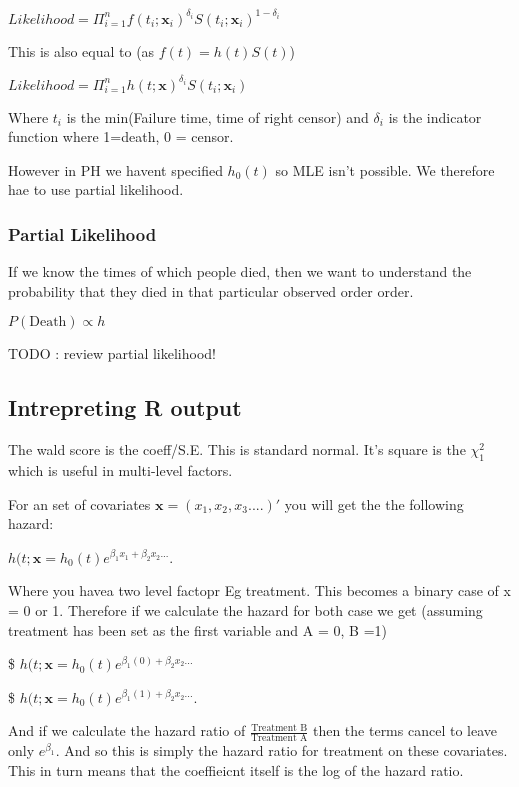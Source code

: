 \documentclass[
  letterpaper,
  DIV=11,
  numbers=noendperiod]{scrreprt}
\begin{document}
\(Likelihood = \Pi^n_{i=1} f(t_i;\textbf{x}_i)^{\delta_i} S(t_i ; \textbf{x}_i)^{1-\delta_i}\)

This is also equal to (as \(f(t) = h(t)S(t)\))

\(Likelihood = \Pi^n_{i=1} h(t;\textbf{x})^{\delta_i} S(t_i ; \textbf{x}_i)\)

Where \(t_i\) is the min(Failure time, time of right censor) and
\(\delta_i\) is the indicator function where 1=death, 0 = censor.

However in PH we havent specified \(h_0(t)\) so MLE isn't possible. We
therefore hae to use partial likelihood.

\hypertarget{partial-likelihood}{%
\subsubsection{Partial Likelihood}\label{partial-likelihood}}

If we know the times of which people died, then we want to understand
the probability that they died in that particular observed order order.

\(P(\text{Death}) \propto h\)

TODO : review partial likelihood!

\hypertarget{intrepreting-r-output}{%
\subsection{Intrepreting R output}\label{intrepreting-r-output}}

The wald score is the coeff/S.E. This is standard normal. It's square is
the \(\chi^2_1\) which is useful in multi-level factors.

For an set of covariates \(\textbf{x} = (x_1, x_2, x_3....)'\) you will
get the the following hazard:

\(h(t;\textbf{x} = h_0(t)e^{\beta_1 x_1 + \beta_2 x_2 ...}\).

Where you havea two level factopr Eg treatment. This becomes a binary
case of x = 0 or 1. Therefore if we calculate the hazard for both case
we get (assuming treatment has been set as the first variable and A = 0,
B =1)

\$
\(h(t;\textbf{x} = h_0(t)e^{\beta_1(0) + \beta_2 x_2 ...}\)

\$
\(h(t;\textbf{x} = h_0(t)e^{\beta_1(1) + \beta_2 x_2 ...}\).

And if we calculate the hazard ratio of
\(\frac{\text{Treatment B}}{\text{Treatment A}}\) then the terms cancel
to leave only \(e^{\beta_1}\). And so this is simply the hazard ratio
for treatment on these covariates. This in turn means that the
coeffieicnt itself is the log of the hazard ratio.
\end{document}
